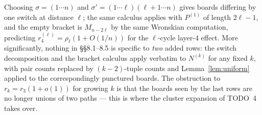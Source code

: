 \begin{remark}
Choosing $\sigma=(1\cdots n)$ and $\sigma'=(1\cdots \ell)(\ell{+}1\cdots
n)$ gives boards differing by one switch at distance $\ell$; the same
calculus applies with $P^{(1)}$ of length $2\ell-1$, and the empty
bracket is $M_{n-2\ell}$ by the same Wronskian computation, predicting
$r_4^{(\ell)}=\rho_\ell(1+O(1/n))$ for the $\ell$-cycle layer-4 effect.
More significantly, nothing in \S\S8.1--8.5 is specific to \emph{two}
added rows: the switch decomposition and the bracket calculus apply
verbatim to $N^{(k)}$ for any fixed $k$, with pair counts replaced by
$(k{-}2)$-tuple counts and Lemma~\ref{lem:uniform} applied to the
correspondingly punctured boards.  The obstruction to
$r_k=r_3(1+o(1))$ for growing $k$ is that the boards seen by the last
rows are no longer unions of two paths --- this is where the cluster
expansion of TODO~4 takes over.
\end{remark}
